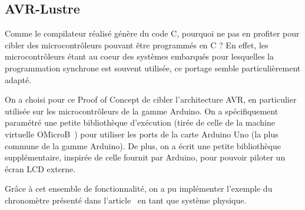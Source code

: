 \documentclass{article}
\begin{document}
\subsection{AVR-Lustre}

Comme le compilateur réalisé génère du code C, pourquoi ne pas en profiter pour cibler des microcontrôleurs pouvant être programmés en C ? En effet, les microcontrôleurs étant au coeur des systèmes embarqués pour lesquelles la programmation synchrone est souvent utilisée, ce portage semble particulièrement adapté.

On a choisi pour ce Proof of Concept de cibler l'architecture AVR, en particulier utilisée sur les microcontrôleurs de la gamme Arduino. On a spécifiquement paramétré une petite bibliothèque d'exécution (tirée de celle de la machine virtuelle OMicroB~\cite{VVC18}) pour utiliser les ports de la carte Arduino Uno (la plus commune de la gamme Arduino). De plus, on a écrit une petite bibliothèque supplémentaire, inspirée de celle fournit par Arduino, pour pouvoir piloter un écran LCD externe.

Grâce à cet ensemble de fonctionnalité, on a pu implémenter l'exemple du chronomètre présenté dans l'article~\cite{Colaco05} en tant que système physique.

{}

\end{document}
